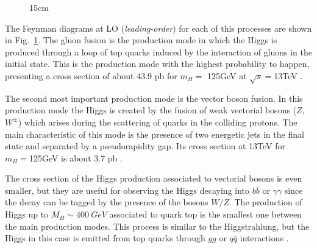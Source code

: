 \begin{figure}[htbp]{15cm}
	\label{fig:Higgs_pro_mechanisms}
\end{figure}

The Feynman diagrams at LO (\textit{leading-order}) for each of this processes are shown in Fig.~\ref{fig:Higgs_pro_mechanisms}. The gluon fusion is the production mode in which the Higgs is produced through a loop of top quarks induced by the interaction of gluons in the initial state. This is the production mode with the highest probability to happen, presenting a cross section of about 43.9 pb for $m_{H} = $ 125GeV at $\sqrt{s} = $13TeV \cite{bib:LHC-Higgs-XSWG-2018}. 

The second most important production mode is the vector boson fusion. In this production mode the Higgs is created by the fusion of weak vectorial bosons ($Z$, $W^{\pm}$) which arises during the scattering of quarks in the colliding protons. The main characteristic of this mode is the presence of two energetic jets in the final state and separated by a pseudorapidity gap. Its cross section at 13TeV for $m_{H} = $125GeV is about 3.7 pb \cite{bib:LHC-Higgs-XSWG-2018,bib:IFAE-14-2008,bib:PhysRevD98-030001-2018}.

The cross section of the Higgs production associated to vectorial bosons is even smaller, but they are useful for observing the Higgs decaying into $b\bar{b}$ or $\gamma\gamma$ since the decay can be tagged by the presence of the bosons $W/Z$. The production of Higgs up to $M_{H} \sim 400~GeV$ associated to quark top is the smallest one between the main production modes. This process is similar to the Higgstrahlung, but the Higgs in this case is emitted from top quarks through $gg$ or $q\bar{q}$ interactions \cite{bib:ellis-2003}.

